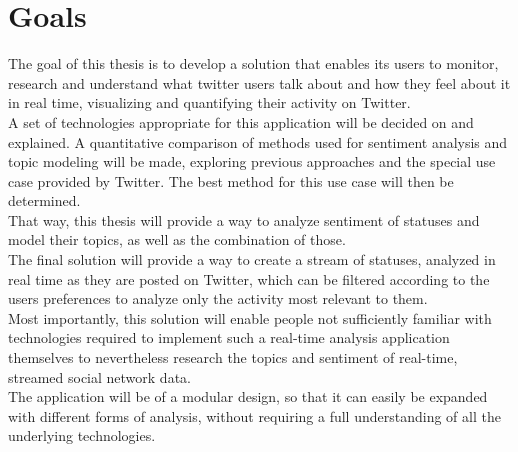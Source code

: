 \chapter{Goals}
\label{ch:goals}

The goal of this thesis is to develop a solution that enables its users to monitor,
research and understand what twitter users talk about and how they feel about it in real time,
visualizing and quantifying their activity on Twitter.
\\
A set of technologies appropriate for this application will be decided on and explained.
A quantitative comparison of methods used for sentiment analysis and topic modeling will be made,
exploring previous approaches and the special use case provided by Twitter.
The best method for this use case will then be determined.
\\
That way, this thesis will provide a way to analyze sentiment of statuses and model their topics,
as well as the combination of those.
\\
The final solution will provide a way to create a stream of statuses, analyzed in real time as they are posted on Twitter,
which can be filtered according to the users preferences to analyze only the activity most relevant to them.
\\
Most importantly, this solution will enable people not sufficiently familiar with technologies required to
implement such a real-time analysis application themselves to nevertheless research the topics and sentiment of real-time,
streamed social network data.
\\
The application will be  of a modular design, so that it can easily be expanded with different forms of analysis,
without requiring a full understanding of all the underlying technologies.
